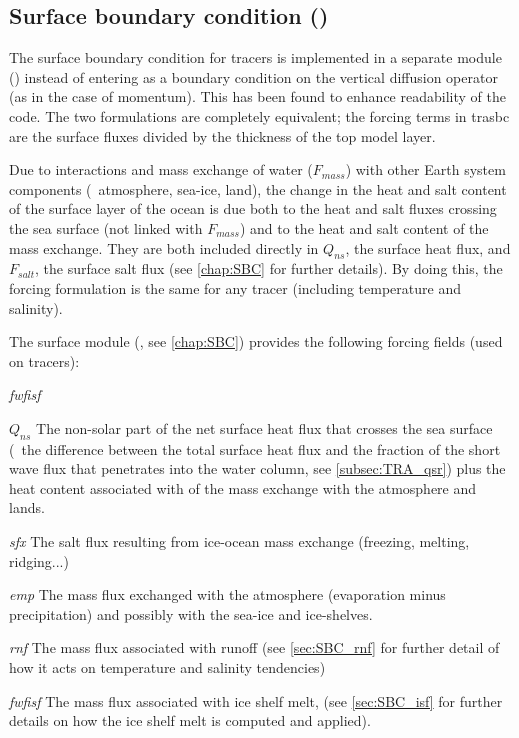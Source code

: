 \documentclass[../main/NEMO_manual]{subfiles}
\begin{document}
\subsection[Surface boundary condition (\textit{trasbc.F90})]{Surface boundary condition (\protect{})}
\label{subsec:TRA_sbc}

The surface boundary condition for tracers is implemented in a separate module () instead of
entering as a boundary condition on the vertical diffusion operator (as in the case of momentum).
This has been found to enhance readability of the code.
The two formulations are completely equivalent;
the forcing terms in trasbc are the surface fluxes divided by the thickness of the top model layer.

Due to interactions and mass exchange of water ($F_{mass}$) with other Earth system components
(\ie\ atmosphere, sea-ice, land),
the change in the heat and salt content of the surface layer of the ocean is due both to
the heat and salt fluxes crossing the sea surface (not linked with $F_{mass}$) and
to the heat and salt content of the mass exchange.
They are both included directly in $Q_{ns}$, the surface heat flux,
and $F_{salt}$, the surface salt flux (see \autoref{chap:SBC} for further details).
By doing this, the forcing formulation is the same for any tracer
(including temperature and salinity).

The surface module (, see \autoref{chap:SBC}) provides the following forcing fields
(used on tracers):

\begin{labeling}{\textit{fwfisf}}
\item [$Q_{ns}$] The non-solar part of the net surface heat flux that crosses the sea surface
  (\ie\ the difference between the total surface heat flux and
  the fraction of the short wave flux that penetrates into the water column,
  see \autoref{subsec:TRA_qsr})
  plus the heat content associated with of the mass exchange with the atmosphere and lands.
\item [\textit{sfx}] The salt flux resulting from ice-ocean mass exchange
  (freezing, melting, ridging...)
\item [\textit{emp}] The mass flux exchanged with the atmosphere (evaporation minus precipitation) and
  possibly with the sea-ice and ice-shelves.
\item [\textit{rnf}] The mass flux associated with runoff
  (see \autoref{sec:SBC_rnf} for further detail of how it acts on temperature and salinity tendencies)
\item [\textit{fwfisf}] The mass flux associated with ice shelf melt,
  (see \autoref{sec:SBC_isf} for further details on how the ice shelf melt is computed and applied).
\end{labeling}
\end{document}
